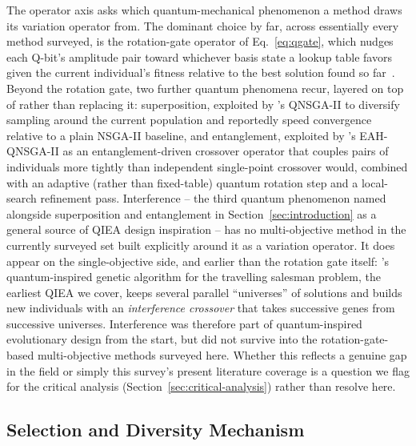 The operator axis asks which quantum-mechanical phenomenon a method
draws its variation operator from. The dominant choice by far, across
essentially every method surveyed, is the rotation-gate operator of
Eq.~\ref{eq:qgate}, which nudges each Q-bit's amplitude pair toward
whichever basis state a lookup table favors given the current
individual's fitness relative to the best solution found so
far~\citep{han2002qea,vivek2025fss}. Beyond the rotation gate, two
further quantum phenomena recur, layered on top of rather than replacing
it: superposition, exploited by \citet{guzel2022qnsga2}'s QNSGA-II to
diversify sampling around the current population and reportedly speed
convergence relative to a plain NSGA-II baseline, and entanglement,
exploited by \citet{kumar2026eahqnsga2}'s EAH-QNSGA-II as an
entanglement-driven crossover operator that couples pairs of individuals
more tightly than independent single-point crossover would, combined
with an adaptive (rather than fixed-table) quantum rotation step and a
local-search refinement pass. Interference -- the third quantum
phenomenon named alongside superposition and entanglement in
Section~\ref{sec:introduction} as a general source of QIEA design
inspiration -- has no multi-objective method in the currently surveyed
set built explicitly around it as a variation operator. It does appear
on the single-objective side, and earlier than the rotation gate itself:
\citet{narayanan1996qiga}'s quantum-inspired genetic algorithm for the
travelling salesman problem, the earliest QIEA we cover, keeps several
parallel ``universes'' of solutions and builds new individuals with an
\emph{interference crossover} that takes successive genes from successive
universes. Interference was therefore part of quantum-inspired
evolutionary design from the start, but did not survive into the
rotation-gate-based multi-objective methods surveyed here. Whether this
reflects a genuine gap in the field or simply this survey's present
literature coverage is a question we flag for the critical analysis
(Section~\ref{sec:critical-analysis}) rather than resolve here.

\subsection{Selection and Diversity Mechanism}
\label{sec:taxonomy:selection}

